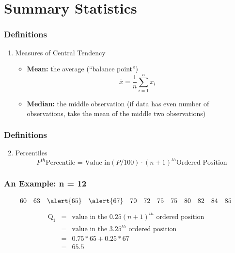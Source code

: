 \documentclass{beamer}
\begin{document}
\section{Summary Statistics}
\begin{frame}
\frametitle{Definitions}
	\begin{enumerate}
		\item Measures of Central Tendency
		\begin{itemize}
			\item \textbf{Mean:} the average (``balance point'')
			$$
			\bar{x} = \frac{1}{n} \sum_{i=1}^n x_i
			$$
			\item \textbf{Median:} the middle observation (if data has even number of 							observations, take the mean of the middle two observations)
		\end{itemize}
	\end{enumerate}
\end{frame}

\begin{frame}
\frametitle{Definitions}
	\begin{enumerate}
	\setcounter{enumi}{1}
		\item Percentiles
		$$
		P^{th} \text{Percentile = Value in}  \left(P/100\right)\cdot (n+1)^{th} \text{Ordered 					Position}
		$$
	\end{enumerate}
\end{frame}

\begin{frame}
\frametitle{An Example: n = 12}
	$$
	\begin{array}{cccccccccccc}
		60 & 63 & \alert{65} & \alert{67} & 70 & 72 & 75 & 75 & 80 & 82 & 84 & 85
	\end{array}
	$$
	\begin{eqnarray*}
		\mbox{Q}_1 &=& \mbox{value in the } 0.25(n+1)^{th}\mbox{ ordered position}\\
			&=& \mbox{value in the } 3.25^{th}\mbox{ ordered position}\\
			&=& 0.75 * 65 + 0.25 * 67\\
			&=& 65.5
	\end{eqnarray*}
\end{frame}
\end{document}
